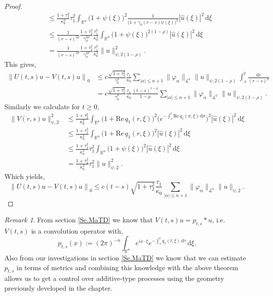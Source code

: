 \documentclass[a4paper, 12pt]{report}
\theoremstyle{remark}
\newtheorem{remark}[theorem]{Remark}
\theoremstyle{definition}
\begin{document}
\begin{proof}
$$\begin{aligned}
& \le \frac{1 + \tau_2^2}{\kappa_0^2}\tau_1^2\int_{\mathbb{R}^n}\big(1 + \psi(\xi)\big)^2\frac{1}{\big(1 + \gamma_0(r - s)\psi(\xi)\big)^2}|\hat{u}(\xi)|^2\,\mathrm{d}\xi\\
& \le \frac{1}{(r - s)^{2\rho}}\frac{1 + \tau_2^2}{\gamma_0^{2\rho}}\frac{\tau_1^2}{\kappa_0^2}\int_{\mathbb{R}^n}\big(1 + \psi(\xi)\big)^{2(1 - \rho)}|\hat{u}(\xi)|^2\,\mathrm{d}\xi\\
& = \frac{1}{(r - s)^{2\rho}}\frac{1 + \tau_2^2}{\gamma_0^{2\rho}}\frac{\tau_1^2}{\kappa_0^2}\|u\|_{\psi, 2(1 - \rho)}^2.
\end{aligned}
$$
This gives,
$$
\begin{aligned}
\left\|U(t, s)u - V(t, s)u\right\|_0 & \le c\frac{\sqrt{1 + \tau_2^2}}{\gamma_0^\rho}\frac{\tau_1}{\kappa_0}\sum_{|\alpha| \le n + 1}\|\varphi_\alpha\|_{\mathcal{L}^1}\|u\|_{\psi, 2(1 - \rho)}\int_s^t\frac{\mathrm{d}r}{(r - s)^\rho}\\
& = c\frac{\sqrt{1 + \tau_2^2}}{\gamma_0^\rho}\frac{\tau_1}{\kappa_0}\frac{(t - s)^{1 - \rho}}{1 - \rho}\sum_{|\alpha| \le n + 1}\|\varphi_\alpha\|_{\mathcal{L}^1}\|u\|_{\psi, 2(1 - \rho)}.
\end{aligned}
$$
Similarly we calculate for $t \ge 0$,
$$
\begin{aligned}
\|V(r, s)u\|_{\psi, 2}^2 & \le \frac{1 + \tau_2^2}{\kappa_0^2}\int_{\mathbb{R}^n}\big(1 + \text{Re}\,q_1(r, \xi)\big)^2\Big(e^{-\int_s^r\text{Re}\,q_1(\sigma, \xi)\,\mathrm{d}\sigma}\Big)^2|\hat{u}(\xi)|^2\,\mathrm{d}\xi\\
& \le \frac{1 + \tau_2^2}{\kappa_0^2}\int_{\mathbb{R}^n}\big(1 + \text{Re}\,q_1(r, \xi)\big)^2|\hat{u}(\xi)|^2\,\mathrm{d}\xi\\
& \le \frac{1 + \tau_2^2}{\kappa_0^2}\tau_1^2\int_{\mathbb{R}^n}\big(1 + \psi(\xi)\big)^2|\hat{u}(\xi)|^2\,\mathrm{d}\xi\\
& = \frac{1 + \tau_2^2}{\kappa_0^2}\tau_1^2\|u\|_{\psi, 2}^2.
\end{aligned}
$$
Which yields,
$$
\left\|U(t, s)u - V(t, s)u\right\|_0 \le c(t - s)\sqrt{1 + \tau_2^2}\frac{\tau_1}{\kappa_0}\sum_{|\alpha| \le n + 1}\|\varphi_\alpha\|_{\mathcal{L}^1}\|u\|_{\psi, 2}.
$$
\end{proof}
\begin{remark}
From section \ref{Se.MaTD} we know that $V(t, s)u = p_{t, s} \ast u$, i.e. $V(t, s)$ is a convolution operator with,
$$
p_{t, s}(x) := (2\pi)^{-n}\int_{\mathbb{R}^n}e^{ix\cdot\xi}e^{-\int_s^tq_1(t, \xi)\,\mathrm{d}\tau}\,\mathrm{d}\xi.
$$
Also from our investigations in section \ref{Se.MaTD} we know that we can estimate $p_{t, s}$ in terms of metrics and combining this knowledge with the above theorem allows us to get a control over additive-type processes using the geometry previously developed in the chapter.
\end{remark}
\end{document}
